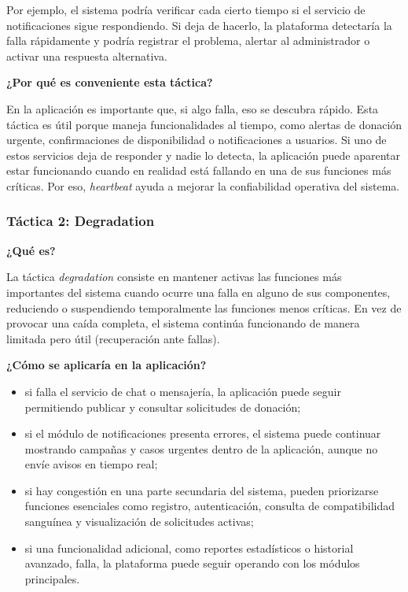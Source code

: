 Por ejemplo, el sistema podría verificar cada cierto tiempo si el servicio de notificaciones sigue respondiendo. Si deja de hacerlo, la plataforma detectaría la falla rápidamente y podría registrar el problema, alertar al administrador o activar una respuesta alternativa.

\medskip
\noindent\textbf{¿Por qué es conveniente esta táctica?}

En la aplicación es importante que, si algo falla, eso se descubra rápido. Esta táctica es útil porque maneja funcionalidades al tiempo, como alertas de donación urgente, confirmaciones de disponibilidad o notificaciones a usuarios. Si uno de estos servicios deja de responder y nadie lo detecta, la aplicación puede aparentar estar funcionando cuando en realidad está fallando en una de sus funciones más críticas. Por eso, \textit{heartbeat} ayuda a mejorar la confiabilidad operativa del sistema.

\subsubsection{Táctica 2: Degradation}

\noindent\textbf{¿Qué es?}

La táctica \textit{degradation} consiste en mantener activas las funciones más importantes del sistema cuando ocurre una falla en alguno de sus componentes, reduciendo o suspendiendo temporalmente las funciones menos críticas. En vez de provocar una caída completa, el sistema continúa funcionando de manera limitada pero útil (recuperación ante fallas).

\medskip
\noindent\textbf{¿Cómo se aplicaría en la aplicación?}

\begin{itemize}
    \item si falla el servicio de chat o mensajería, la aplicación puede seguir permitiendo publicar y consultar solicitudes de donación;
    \item si el módulo de notificaciones presenta errores, el sistema puede continuar mostrando campañas y casos urgentes dentro de la aplicación, aunque no envíe avisos en tiempo real;
    \item si hay congestión en una parte secundaria del sistema, pueden priorizarse funciones esenciales como registro, autenticación, consulta de compatibilidad sanguínea y visualización de solicitudes activas;
    \item si una funcionalidad adicional, como reportes estadísticos o historial avanzado, falla, la plataforma puede seguir operando con los módulos principales.
\end{itemize}


